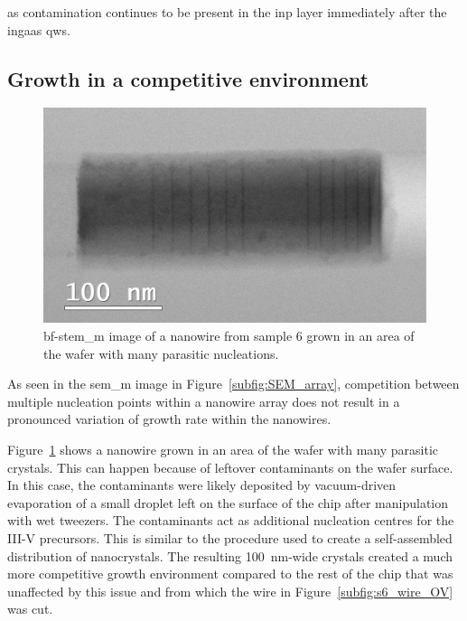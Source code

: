\Acl{as} contamination continues to be present in the \acs{inp} layer immediately after the \acs{ingaas} \acl{qw}s.

\subsection{Growth in a competitive environment}

\begin{figure}
    \centering
    \includegraphics[width=\textwidth]{4_Properties/Fig/s6_competitive_OV.pdf}
    \caption{\acs{bf}-\acs{stem_m} image of a nanowire from sample 6 grown in an area of the wafer with many parasitic nucleations.}
    \label{fig:s6_competitive_OV}
\end{figure}

As seen in the \acs{sem_m} image in Figure~\ref{subfig:SEM_array}, competition between multiple nucleation points within a nanowire array does not result in a pronounced variation of growth rate within the nanowires. 

Figure~\ref{fig:s6_competitive_OV} shows a nanowire grown in an area of the wafer with many parasitic crystals. This can happen because of leftover contaminants on the wafer surface. In this case, the contaminants were likely deposited by vacuum-driven evaporation of a small droplet left on the surface of the chip after manipulation with wet tweezers. The contaminants act as additional nucleation centres for the III-V precursors. This is similar to the procedure used to create a self-assembled distribution of nanocrystals. The resulting \qty{100}{\nano\metre}-wide crystals created a much more competitive growth environment compared to the rest of the chip that was unaffected by this issue and from which the wire in Figure~\ref{subfig:s6_wire_OV} was cut.

